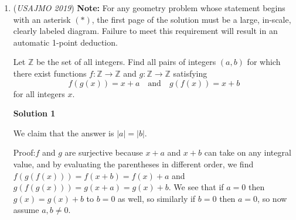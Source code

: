 \begin{enumerate}
 Now assume $ab,a,b$ are odd. FTSOC, let this case satisfy the claim. Then, for each apple, define it's $\textit{position}$ as the sum of the distance from it to all other pairs. So for apple in bowl $i \le a$ originally, the position of $i$ is $\sum_{j = a+1}^{b} j - i .$

 Every time a legal move is made, the position of the apple decreases by $b - 1 + 2 = b+1$ (from the $b-1$ pears not part of the move and the decrease in $2$ by the corresponding pear). Also note that there needs to be exactly $ab$ moves in order to attain the final configurations. So the difference in sum of positions of the apples at the beginning and end is $ab(b+1)$. Mathematically,
 \begin{align*} \sum_{i = 1}^{a} \sum_{j = a+1}^{a+b} j - i  - \sum_{i = b + 1}^{b+a} \sum_{j = 1}^{b} j - i &= ab(b+1)\\ (\frac{ab(2a + b + 1)}{2} - \frac{ab(a + 1)}{2}) - (\frac{ab(b+1)}{2} - \frac{ab(a + 2b + 1)}{2}) &=  \\ ab(a+b) &= ab(b+1) \\ a &= 1. \end{align*}
A symmetric argument for the position of pears gives $b = 1$. Clearly the $a=b=1$ does not have a solution, therefore we have contradiction. $\square$



	\item (\textit{USAJMO 2019}) \textbf{Note:} For any geometry problem whose statement begins with an asterisk $(*)$, the first page of the solution must be a large, in-scale, clearly labeled diagram. Failure to meet this requirement will result in an automatic 1-point deduction.


 Let $\mathbb Z$ be the set of all integers. Find all pairs of integers $(a,b)$ for which there exist functions $f:\mathbb Z\rightarrow\mathbb Z$ and $g:\mathbb Z\rightarrow\mathbb Z$ satisfying 
 \[f(g(x))=x+a\quad\text{and}\quad g(f(x))=x+b\] for all integers $x$.


 



\textbf{Solution 1}

We claim that the answer is $|a|=|b|$.

 Proof:$f$ and $g$ are surjective because $x+a$ and $x+b$ can take on any integral value, and by evaluating the parentheses in different order, we find $f(g(f(x)))=f(x+b)=f(x)+a$ and $g(f(g(x)))=g(x+a)=g(x)+b$. We see that if $a=0$ then $g(x)=g(x)+b$ to $b=0$ as well, so similarly if $b=0$ then $a=0$, so now assume $a, b\ne 0$. 


\end{enumerate}
